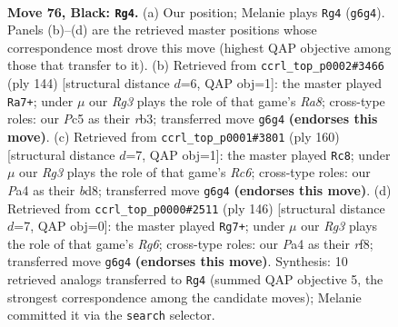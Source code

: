 \documentclass[11pt]{article}
\begin{document}
\clearpage

\begin{figure}[p]\centering
\begin{subfigure}{0.46\textwidth}\centering
\resizebox{\linewidth}{!}{%
\newchessgame
\chessboard[
  setfen={8/4k3/6r1/2pp4/p7/8/5K2/8 b - - 9 76},
  showmover=false,
  pgfstyle=straightmove, color=movearrow, markmove={g6-g4}
]}
\caption{}
\end{subfigure}\hfill
\begin{subfigure}{0.46\textwidth}\centering
\resizebox{\linewidth}{!}{%
\newchessgame
\chessboard[
  setfen={R7/4k3/8/6Pp/8/1r6/8/4K3 w - - 13 73},
  showmover=false,
  pgfstyle=straightmove, color=movearrow, markmove={a8-a7}
]}
\caption{}
\end{subfigure}
\\[4pt]
\begin{subfigure}{0.46\textwidth}\centering
\resizebox{\linewidth}{!}{%
\newchessgame
\chessboard[
  setfen={3b4/5k2/2R5/4p3/6P1/8/5K2/8 w - - 21 81},
  showmover=false,
  pgfstyle=straightmove, color=movearrow, markmove={c6-c8}
]}
\caption{}
\end{subfigure}\hfill
\begin{subfigure}{0.46\textwidth}\centering
\resizebox{\linewidth}{!}{%
\newchessgame
\chessboard[
  setfen={5r2/k7/6R1/p7/8/2P5/K7/8 w - - 1 74},
  showmover=false,
  pgfstyle=straightmove, color=movearrow, markmove={g6-g7}
]}
\caption{}
\end{subfigure}
\caption{\textbf{Move 76, Black: \texttt{Rg4}.} (a) Our position; Melanie plays \texttt{Rg4} (\texttt{g6g4}). Panels (b)--(d) are the retrieved master positions whose correspondence most drove this move (highest QAP objective among those that transfer to it). (b) Retrieved from \texttt{ccrl\_top\_p0002\#3466} (ply 144) [structural distance $d$=6, QAP obj=1]: the master played \texttt{Ra7+}; under $\mu$ our \emph{Rg3} plays the role of that game's \emph{Ra8}; cross-type roles: our \emph{P}c5 as their \emph{r}b3; transferred move \texttt{g6g4} \textbf{(endorses this move)}. (c) Retrieved from \texttt{ccrl\_top\_p0001\#3801} (ply 160) [structural distance $d$=7, QAP obj=1]: the master played \texttt{Rc8}; under $\mu$ our \emph{Rg3} plays the role of that game's \emph{Rc6}; cross-type roles: our \emph{P}a4 as their \emph{b}d8; transferred move \texttt{g6g4} \textbf{(endorses this move)}. (d) Retrieved from \texttt{ccrl\_top\_p0000\#2511} (ply 146) [structural distance $d$=7, QAP obj=0]: the master played \texttt{Rg7+}; under $\mu$ our \emph{Rg3} plays the role of that game's \emph{Rg6}; cross-type roles: our \emph{P}a4 as their \emph{r}f8; transferred move \texttt{g6g4} \textbf{(endorses this move)}. Synthesis: 10 retrieved analogs transferred to \texttt{Rg4} (summed QAP objective 5, the strongest correspondence among the candidate moves); Melanie committed it via the \texttt{search} selector.}
\label{fig:thought-m151}
\end{figure}
\end{document}
